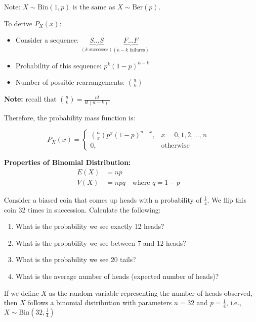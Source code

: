 \documentclass{article}
\begin{document}
    Note: $X \sim \text{Bin}(1, p)$ is the same as $X \sim \text{Ber}(p)$.

    To derive $P_X(x)$:

    \begin{itemize}
        \item Consider a sequence: $\underbrace{S \ldots S}_{(k \text{ successes})} \underbrace{F \ldots F}_{(n-k \text{ failures})}$
        \item Probability of this sequence: $p^k(1-p)^{n-k}$
        \item Number of possible rearrangements: $\binom{n}{k}$
    \end{itemize}

    \textbf{Note:} recall that $\binom{n}{k} = \frac{n!}{k!(n-k)!}$

    Therefore, the probability mass function is:

    \[
    P_X(x) = 
    \begin{cases}
        \binom{n}{x} p^x (1-p)^{n-x}, & x = 0, 1, 2, \ldots, n \\
        0, & \text{otherwise}
    \end{cases}
    \]
    
    \textbf{Properties of Binomial Distribution:}
    \begin{align*}
        E(X) &= np \\
        V(X) &= npq \quad \text{where } q = 1-p
    \end{align*}

    Consider a biased coin that comes up heads with a probability of $\frac{1}{4}$. We flip this coin 32 times in succession. Calculate the following:

    \begin{enumerate}
        \item What is the probability we see exactly 12 heads?
        \item What is the probability we see between 7 and 12 heads?
        \item What is the probability we see 20 tails?
        \item What is the average number of heads (expected number of heads)?
    \end{enumerate}

    If we define $X$ as the random variable representing the number of heads observed, then $X$ follows a binomial distribution with parameters $n=32$ and $p=\frac{1}{4}$, i.e., $X \sim \text{Bin}(32, \frac{1}{4})$
\end{document}
